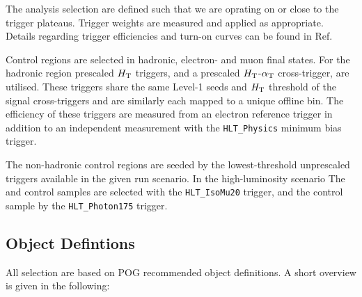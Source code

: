 The analysis selection are defined such that we are oprating on or close to the trigger plateaus. Trigger weights are measured and applied
as appropriate. Details regarding trigger efficiencies and turn-on curves can be found in Ref.~\cite{alphaTnote}


Control regions are selected in hadronic, electron- and muon final states. For the hadronic region 
prescaled $\mbox{$H_\text{T}$}$ triggers, and a prescaled  $\mbox{$H_\text{T}$}$-$\alpha_{\text{T}}$ cross-trigger, are utilised.
These triggers share the same Level-1 seeds and $\mbox{$H_\text{T}$}$ threshold of the signal cross-triggers and are similarly each mapped 
to a unique offline bin. The efficiency of these triggers are measured from an electron 
reference trigger in addition to an independent measurement with the \verb!HLT_Physics! 
minimum bias trigger.


The non-hadronic control regions are seeded by the lowest-threshold unprescaled triggers available in the given run scenario. In the high-luminosity scenario The 
\mj and \mmj control samples are selected with the \verb!HLT_IsoMu20! trigger, and the \gj control sample by the \verb!HLT_Photon175! trigger. 







\subsection{Object Defintions}

All selection are based on POG recommended object definitions. A short overview is given in the following:

